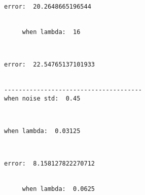 \documentclass[11pt]{article}
\begin{document}
    \begin{Verbatim}[commandchars=\\\{\}]
     error:  20.2648665196544


     when lambda:  16

    \end{Verbatim}

    \begin{center}
    \end{center}
    { \hspace*{\fill} \\}
    
    \begin{Verbatim}[commandchars=\\\{\}]
     error:  22.54765137101933


--------------------------------------
when noise std:  0.45

    \end{Verbatim}

    \begin{center}
    \end{center}
    { \hspace*{\fill} \\}
    
    \begin{Verbatim}[commandchars=\\\{\}]
     when lambda:  0.03125

    \end{Verbatim}

    \begin{center}
    \end{center}
    { \hspace*{\fill} \\}
    
    \begin{Verbatim}[commandchars=\\\{\}]
     error:  8.158127822270712


     when lambda:  0.0625

    \end{Verbatim}

    \begin{center}
    \end{center}
    { \hspace*{\fill} \\}
    
\end{document}
